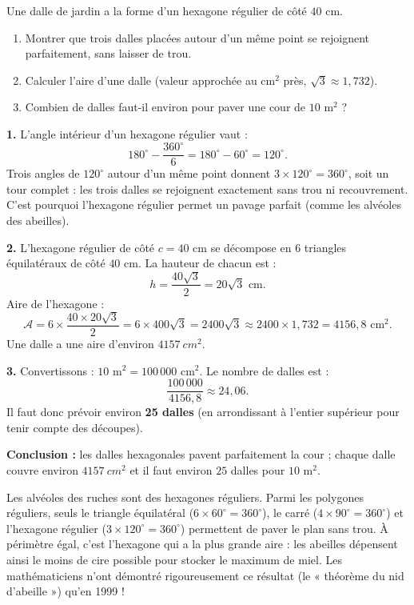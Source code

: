\documentclass[11pt]{article}
\begin{document}
\begin{exoresolu}
Une dalle de jardin a la forme d'un hexagone régulier de côté $40$ cm.
\begin{enumerate}
\item Montrer que trois dalles placées autour d'un même point se rejoignent parfaitement, sans laisser de trou.
\item Calculer l'aire d'une dalle (valeur approchée au cm$^2$ près, $\sqrt{3} \approx 1{,}732$).
\item Combien de dalles faut-il environ pour paver une cour de $10$ m$^2$ ?
\end{enumerate}
\tcblower
\textbf{1.} L'angle intérieur d'un hexagone régulier vaut :
\[ 180^\circ - \frac{360^\circ}{6} = 180^\circ - 60^\circ = 120^\circ. \]
Trois angles de $120^\circ$ autour d'un même point donnent $3 \times 120^\circ = 360^\circ$, soit un tour complet : les trois dalles se rejoignent exactement sans trou ni recouvrement. C'est pourquoi l'hexagone régulier permet un pavage parfait (comme les alvéoles des abeilles).

\textbf{2.} L'hexagone régulier de côté $c = 40$ cm se décompose en $6$ triangles équilatéraux de côté $40$ cm. La hauteur de chacun est :
\[ h = \frac{40\sqrt{3}}{2} = 20\sqrt{3} \text{ cm}. \]
Aire de l'hexagone :
\[ \mathcal{A} = 6 \times \frac{40 \times 20\sqrt{3}}{2} = 6 \times 400\sqrt{3} = 2400\sqrt{3} \approx 2400 \times 1{,}732 = 4156{,}8 \text{ cm}^2. \]
Une dalle a une aire d'environ $\SI{4157}{cm^2}$.

\textbf{3.} Convertissons : $10$ m$^2 = 100\,000$ cm$^2$. Le nombre de dalles est :
\[ \frac{100\,000}{4156{,}8} \approx 24{,}06. \]
Il faut donc prévoir environ \textbf{25 dalles} (en arrondissant à l'entier supérieur pour tenir compte des découpes).

\textbf{Conclusion :} les dalles hexagonales pavent parfaitement la cour ; chaque dalle couvre environ $\SI{4157}{cm^2}$ et il faut environ $25$ dalles pour $10$ m$^2$.
\end{exoresolu}

\begin{savaistu}
Les alvéoles des ruches sont des hexagones réguliers. Parmi les polygones réguliers, seuls le triangle équilatéral ($6 \times 60^\circ = 360^\circ$), le carré ($4 \times 90^\circ = 360^\circ$) et l'hexagone régulier ($3 \times 120^\circ = 360^\circ$) permettent de paver le plan sans trou. À périmètre égal, c'est l'hexagone qui a la plus grande aire : les abeilles dépensent ainsi le moins de cire possible pour stocker le maximum de miel. Les mathématiciens n'ont démontré rigoureusement ce résultat (le « théorème du nid d'abeille ») qu'en 1999 !
\end{savaistu}
\end{document}
